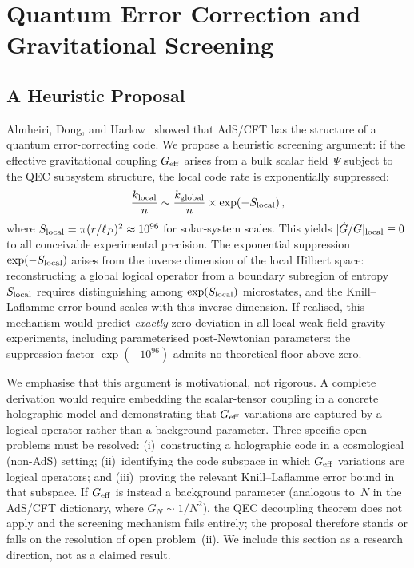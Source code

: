 \documentclass[12pt,a4paper]{article}
\theoremstyle{remark}
\begin{document}
\section{Quantum Error Correction and Gravitational Screening}

\subsection{A Heuristic Proposal}

Almheiri, Dong, and Harlow~\cite{ADH2015} showed that AdS/CFT has the structure of a quantum error-correcting code.
We propose a heuristic screening argument: if the effective gravitational coupling $G_{\rm eff}$ arises from a bulk scalar field~$\Psi$ subject to the QEC subsystem structure, the local code rate is exponentially suppressed:
\begin{equation}
\frac{k_{\rm local}}{n} \sim \frac{k_{\rm global}}{n}\times \exp(-S_{\rm local})\,,
\end{equation}
where $S_{\rm local} = \pi(r/\ell_P)^2 \approx 10^{96}$ for solar-system scales.
This yields $|\dot G/G|_{\rm local} \equiv 0$ to all conceivable experimental precision.
The exponential suppression $\exp(-S_{\rm local})$ arises from the inverse dimension of the local Hilbert space: reconstructing a global logical operator from a boundary subregion of entropy~$S_{\rm local}$ requires distinguishing among $\exp(S_{\rm local})$ microstates, and the Knill--Laflamme error bound scales with this inverse dimension.
If realised, this mechanism would predict \emph{exactly} zero deviation in all local weak-field gravity experiments, including parameterised post-Newtonian parameters: the suppression factor $\exp(-10^{96})$ admits no theoretical floor above zero.

We emphasise that this argument is motivational, not rigorous.
A complete derivation would require embedding the scalar-tensor coupling in a concrete holographic model and demonstrating that $G_{\rm eff}$ variations are captured by a logical operator rather than a background parameter.
Three specific open problems must be resolved: (i)~constructing a holographic code in a cosmological (non-AdS) setting; (ii)~identifying the code subspace in which $G_{\rm eff}$ variations are logical operators; and (iii)~proving the relevant Knill--Laflamme error bound in that subspace.
If $G_{\rm eff}$ is instead a background parameter (analogous to~$N$ in the AdS/CFT dictionary, where $G_N \sim 1/N^2$), the QEC decoupling theorem does not apply and the screening mechanism fails entirely; the proposal therefore stands or falls on the resolution of open problem~(ii).
We include this section as a research direction, not as a claimed result.
\end{document}
